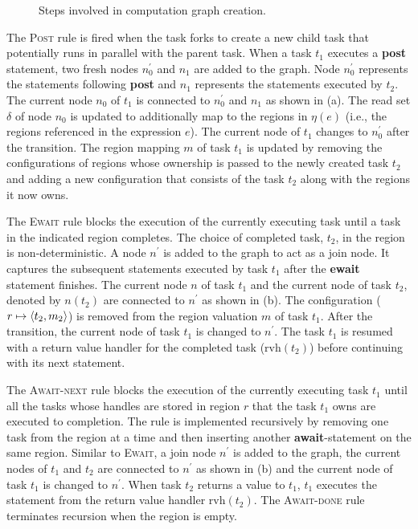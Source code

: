 \begin{figure}
\begin{center}
  \caption{Steps involved in computation graph creation.}
   \label{fig:cgcreation}
   \end{center}
\end{figure}

The \textsc{Post} rule is fired when the task forks to create a new child task that potentially runs in parallel with the parent task. When a task $t_1$ executes a \textbf{post} statement, two fresh nodes $n_0^\prime$ and $n_1$ are added to the graph. Node $n_0^\prime$ represents the statements following \textbf{post} and $n_1$ represents the statements executed by $t_2$. The current node $n_0$ of $t_1$ is connected to $n_0^\prime$ and $n_1$ as shown in (a). The read set $\delta$ of node $n_0$ is updated to additionally map to the regions in $\eta(e)$ (i.e., the regions referenced in the expression $e$). The current node of $t_1$ changes to $n_0^\prime$ after the transition. The region mapping $m$ of task $t_1$ is updated by removing the configurations of regions whose ownership is passed to the newly created task $t_2$ and adding a new configuration that consists of the task $t_2$ along with the regions it now owns.

The \textsc{Ewait} rule blocks the execution of the currently executing task until a task in the indicated region completes. The choice of completed task, $t_2$, in the region is non-deterministic. A node $n^\prime$ is added to the graph to act as a join node. It captures the subsequent statements executed by task $t_1$ after the \textbf{ewait} statement finishes. The current node $n$ of task $t_1$ and the current node of task $t_2$, denoted by $n(t_2)$ are connected to $n^\prime$ as shown in (b). The configuration ($r \mapsto \langle t_2,m_2 \rangle $) is removed from the region valuation $m$ of task $t_1$. After the transition, the current node of task $t_1$ is changed to $n^\prime$.  The task $t_1$ is resumed with a return value handler for the completed task ($\mathrm{rvh}(t_2)$) before continuing with its next statement.

The \textsc{Await-next} rule blocks the execution of the currently executing task $t_1$ until all the tasks whose handles are stored in region $r$ that the task $t_1$ owns are executed to completion. The rule is implemented recursively by removing one task from the region at a time and then inserting another \textbf{await}-statement on the same region. Similar to \textsc{Ewait}, a join node $n^\prime$ is added to the graph, the current nodes of $t_1$ and $t_2$ are connected to $n^\prime$ as shown in (b) and the current node of task $t_1$ is changed to $n^\prime$. When task $t_2$ returns a value to $t_1$, $t_1$ executes the statement from the return value handler $\mathrm{rvh}(t_2)$. The \textsc{Await-done} rule terminates recursion when the region is empty. 

